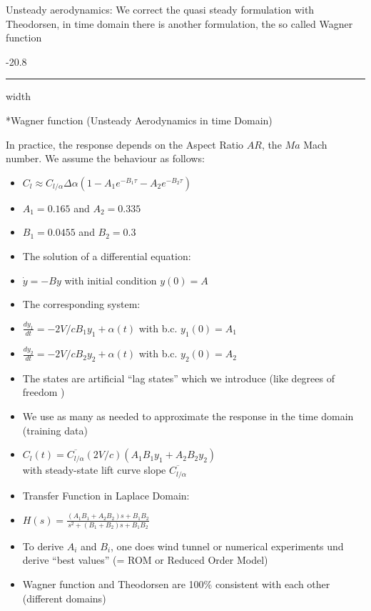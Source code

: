 \documentclass[8pt, landscape, fleqn]{scrartcl}
\makeatletter
\renewcommand{\subsubsection}{\@startsection{subsubsection}{1}{0mm}%
{-2\baselineskip}{0.8\baselineskip}%
{\hrule depth 0.2pt width\columnwidth\vspace*{1.2em}\normalsize\bfseries\rmfamily}}
\makeatother
\begin{document}
\begin{multicols*}{3}
 Unsteady aerodynamics: We correct the quasi steady formulation with Theodorsen, in time domain there is another formulation, the so called Wagner function

 \subsubsection*{Wagner function (Unsteady Aerodynamics in time Domain)}

 In practice, the response depends on the Aspect Ratio $AR$, the $Ma$ Mach number. We assume the behaviour as follows:

 \begin{itemize}
     \item $C_l \approx C_{l/\alpha} \Delta \alpha (1- A_1 e^{-B_1 \tau} - A_2 e^{-B_2 \tau})$
     \item $A_1 = 0.165$ and $A_2 = 0.335$ 
     \item $B_1 = 0.0455$ and $B_2 = 0.3$
     \item The solution of a differential equation:
     \item $\dot{y} = -B y$ with initial condition $y(0) = A$
     \item The corresponding system:
     \item $\frac{dy_1}{dt} = -2V/c B_1 y_1+\alpha(t)$ with b.c. $y_1(0) = A_1$
     \item $\frac{dy_2}{dt} = -2V/c B_2 y_2+\alpha(t)$ with b.c. $y_2(0) = A_2$
     \item The states are artificial ``lag states'' which we introduce (like degrees of freedom )
     \item We use as many as needed to approximate the response in the time domain (training data)
     \item $C_l(t) = \overline{C_{l/\alpha}} (2V/c)(A_1B_1y_1 + A_2B_2y_2)$ \\ with steady-state lift curve slope $\overline{C_{l/\alpha}}$
     \item Transfer Function in Laplace Domain:
     \item $H(s) = \frac{(A_1B_1+A_2B_2)s + B_1B_2}{s^2+(B_1+B_2)s + B_1B_2}$
     \item To derive $A_i$ and $B_i$, one does wind tunnel or numerical experiments und derive ``best values'' (= ROM or Reduced Order Model)
     \item Wagner function and Theodorsen are 100\% consistent with each other (different domains)
 \end{itemize}


\end{multicols*}
\end{document}
